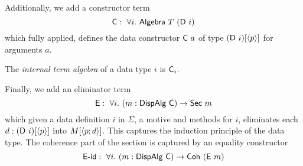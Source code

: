 Additionally, we add a constructor term
\[
	\mta{C} :\ \forall i.\ \mta{Algebra}\ T\ (\mta{D}\ i)
\]
which fully applied, defines the data constructor $\textsf{C}\ a$ of type
$(\textsf{D}\ i)[\langle p\rangle]$ for arguments $a$.

\begin{definition}
	The \emph{internal term algebra} of a data type $i$ is $\textsf{C}_i$.
\end{definition}




Finally, we add an eliminator term
\[
	\mta{E} :\ \forall i.\ (m : \mta{DispAlg}\ \mta{C}) \to \mta{Sec}\ m
\]
which given a data definition $i$ in $\Sigma$, a motive and methods for $i$,
eliminates each $d : (\textsf{D}\ i)[\langle p\rangle]$ into $M[\langle p;d\rangle]$. This captures
the induction principle of the data type. The coherence part of the section is
captured by an equality constructor
\[
	\mta{E-id} :\ \forall i.\ (m : \mta{DispAlg}\ \mta{C}) \to \mta{Coh}\ (\mta{E}\ m)
\]

